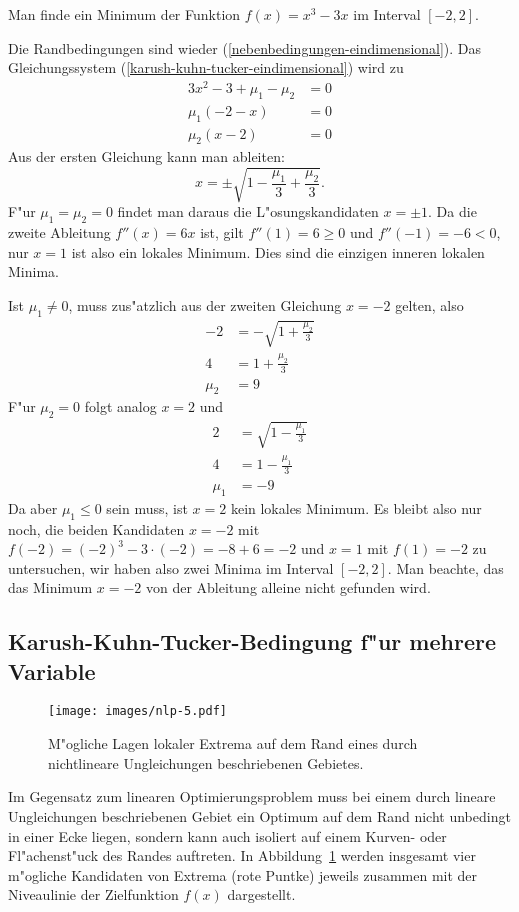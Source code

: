 \begin{beispiel}
Man finde ein Minimum der Funktion $f(x)=x^3-3x$ im Interval $[-2,2]$.

\medskip
{\parindent 0pt
Die Randbedingungen sind wieder (\ref{nebenbedingungen-eindimensional}).}
Das Gleichungssystem (\ref{karush-kuhn-tucker-eindimensional}) wird
zu
\begin{align*}
3x^2-3+\mu_1-\mu_2&=0\\
\mu_1(-2-x)&= 0\\
\mu_2(x-2)&= 0
\end{align*}
Aus der ersten Gleichung kann man ableiten:
\[
x=\pm
\sqrt{1-\frac{\mu_1}3+\frac{\mu_2}3}.
\]
F"ur $\mu_1=\mu_2=0$ findet man daraus die L"osungskandidaten
$x=\pm 1$. Da die zweite Ableitung $f''(x)=6x$ ist, gilt $f''(1)=6\ge 0$
und $f''(-1)=-6<0$, nur $x=1$ ist also ein lokales Minimum. Dies sind die
einzigen inneren lokalen Minima.

Ist $\mu_1\ne 0$, muss zus"atzlich aus der zweiten
Gleichung $x=-2$ gelten, also
\begin{align*}
-2&=-\sqrt{1+\frac{\mu_2}3}\\
4&=1+\frac{\mu_2}3\\
\mu_2&=9
\end{align*}
F"ur $\mu_2=0$  folgt analog $x=2$ und
\begin{align*}
2&=\sqrt{1-\frac{\mu_1}3}\\
4&=1-\frac{\mu_1}3\\
\mu_1&=-9
\end{align*}
Da aber $\mu_1\le 0$ sein muss, ist $x=2$ kein lokales Minimum.
Es bleibt also nur noch, die beiden Kandidaten $x=-2$
mit $f(-2)=(-2)^3-3\cdot(-2)=-8+6=-2$
und $x=1$ mit $f(1)=-2$
zu untersuchen, wir haben also zwei Minima im Interval $[-2,2]$.
Man beachte, das das Minimum $x=-2$ von der Ableitung alleine nicht
gefunden wird.
\end{beispiel}

\subsection{Karush-Kuhn-Tucker-Bedingung f"ur mehrere Variable}
\begin{figure}
\begin{center}
\texttt{[image: images/nlp-5.pdf]}
\end{center}
\caption{M"ogliche Lagen lokaler Extrema auf dem Rand eines durch
nichtlineare
Ungleichungen beschriebenen Gebietes.\label{nlp:kkt-moegliche-extrema}}
\end{figure}
Im Gegensatz zum linearen Optimierungsproblem muss bei einem durch
lineare Ungleichungen beschriebenen Gebiet ein
Optimum auf dem Rand nicht unbedingt in einer Ecke liegen,
sondern kann auch isoliert auf einem Kurven- oder Fl"achenst"uck
des Randes auftreten.
In Abbildung~\ref{nlp:kkt-moegliche-extrema} werden insgesamt
vier m"ogliche Kandidaten von Extrema (rote Puntke) jeweils zusammen mit
der Niveaulinie der Zielfunktion $f(x)$ dargestellt.

